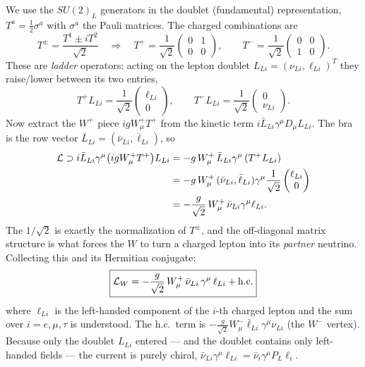 We use the $SU(2)_L$ generators in the doublet (fundamental)
representation, $T^a = \tfrac12\sigma^a$ with $\sigma^a$ the Pauli
matrices. The charged combinations are
\begin{equation}
  T^\pm = \frac{T^1 \pm iT^2}{\sqrt2}
  \quad\Longrightarrow\quad
  T^+ = \frac{1}{\sqrt2}\begin{pmatrix}0&1\\0&0\end{pmatrix},
  \qquad
  T^- = \frac{1}{\sqrt2}\begin{pmatrix}0&0\\1&0\end{pmatrix}.
  \label{eq:lec19:t-pm-matrices}
\end{equation}
These are \emph{ladder} operators: acting on the lepton doublet
$L_{Li}=(\nu_{Li},\ell_{Li})^T$ they raise/lower between its two entries,
\begin{equation}
  T^+L_{Li} = \frac{1}{\sqrt2}\begin{pmatrix}\ell_{Li}\\0\end{pmatrix},
  \qquad
  T^-L_{Li} = \frac{1}{\sqrt2}\begin{pmatrix}0\\\nu_{Li}\end{pmatrix}.
  \label{eq:lec19:t-pm-action}
\end{equation}
Now extract the $W^+$ piece $igW^+_\mu T^+$ from the kinetic term
$i\bar L_{Li}\gamma^\mu D_\mu L_{Li}$. The bra is the row vector
$\bar L_{Li}=(\bar\nu_{Li},\bar\ell_{Li})$, so
\begin{align}
  \mathcal{L} \supset i\bar L_{Li}\gamma^\mu\bigl(igW^+_\mu T^+\bigr)L_{Li}
  &= -g\,W^+_\mu\,\bar L_{Li}\gamma^\mu\,(T^+L_{Li})
  \notag\\
  &= -g\,W^+_\mu\,(\bar\nu_{Li},\bar\ell_{Li})\gamma^\mu
     \frac{1}{\sqrt2}\begin{pmatrix}\ell_{Li}\\0\end{pmatrix}
  \notag\\
  &= -\frac{g}{\sqrt2}\,W^+_\mu\,\bar\nu_{Li}\gamma^\mu\ell_{Li}.
  \label{eq:lec19:w-extraction}
\end{align}
The $1/\sqrt2$ is exactly the normalization of $T^\pm$, and the
off-diagonal matrix structure is what forces the $W$ to turn a charged
lepton into its \emph{partner} neutrino. Collecting this and its
Hermitian conjugate:
\begin{equation}
  \boxed{
    \mathcal{L}_W = -\frac{g}{\sqrt2}\,W^+_\mu\,\bar\nu_{Li}\,\gamma^\mu\,\ell_{Li}
              + \mathrm{h.c.}
  }
  \label{eq:lec19:w-interaction}
\end{equation}
where $\ell_{Li}$ is the left-handed component of the $i$-th charged
lepton and the sum over $i=e,\mu,\tau$ is understood. The h.c.\ term is
$-\frac{g}{\sqrt2}W^-_\mu\bar\ell_{Li}\gamma^\mu\nu_{Li}$ (the $W^-$
vertex). Because only the doublet $L_{Li}$ entered --- and the doublet
contains only left-handed fields --- the current is purely chiral,
$\bar\nu_{Li}\gamma^\mu\ell_{Li}=\bar\nu_i\gamma^\mu P_L\ell_i$.

